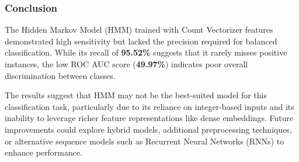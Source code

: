 \subsubsection{Conclusion}

The Hidden Markov Model (HMM) trained with Count Vectorizer features demonstrated high sensitivity but lacked the precision required for balanced classification. While its recall of \textbf{95.52\%} suggests that it rarely misses positive instances, the low ROC AUC score (\textbf{49.97\%}) indicates poor overall discrimination between classes. 

The results suggest that HMM may not be the best-suited model for this classification task, particularly due to its reliance on integer-based inputs and its inability to leverage richer feature representations like dense embeddings. Future improvements could explore hybrid models, additional preprocessing techniques, or alternative sequence models such as Recurrent Neural Networks (RNNs) to enhance performance.

\newpage